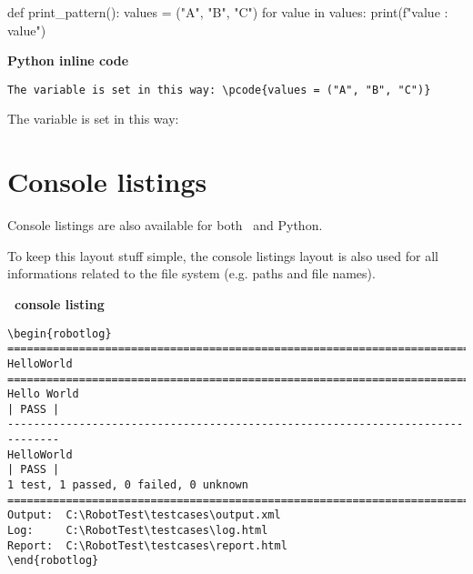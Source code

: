 \documentclass[a4paper,10pt]{report}
\begin{document}
\begin{pythoncode}[caption=Python code example, 
                   linebackgroundcolor=\hlcode{1,3}]
def print_pattern():
    values = ("A", "B", "C")
    for value in values:
        print(f"value : {value}")
\end{pythoncode}

\vspace{2ex}

\textbf{Python inline code}
\begin{verbatim}
The variable is set in this way: \pcode{values = ("A", "B", "C")}
\end{verbatim}

The variable is set in this way: 

\newpage

\section{Console listings}

Console listings are also available for both \rfw\ and Python.

To keep this layout stuff simple, the console listings layout is also used for all informations related to the file system (e.g. paths and file names).


\vspace{2ex}

\textbf{\rfw\ console listing}

\begin{verbatim}
\begin{robotlog}
==============================================================================
HelloWorld
==============================================================================
Hello World                                                           | PASS |
------------------------------------------------------------------------------
HelloWorld                                                            | PASS |
1 test, 1 passed, 0 failed, 0 unknown
==============================================================================
Output:  C:\RobotTest\testcases\output.xml
Log:     C:\RobotTest\testcases\log.html
Report:  C:\RobotTest\testcases\report.html
\end{robotlog}
\end{verbatim}
\end{document}
